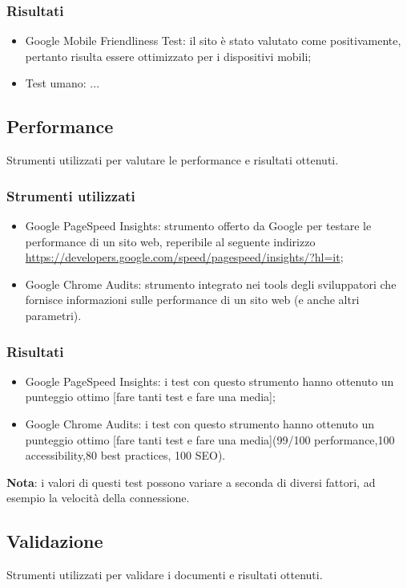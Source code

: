 \documentclass[12pt]{article}
\begin{document}
	\subsubsection{Risultati}
		\begin{itemize}
			\item Google Mobile Friendliness Test: il sito è stato valutato come positivamente, pertanto risulta essere ottimizzato per i dispositivi mobili;
			\item Test umano: ...
		\end{itemize}
	\subsection{Performance}
	Strumenti utilizzati per valutare le performance e risultati ottenuti.
	\subsubsection{Strumenti utilizzati}
		\begin{itemize}
			\item Google PageSpeed Insights: strumento offerto da Google per testare le performance di un sito web, reperibile al seguente indirizzo \url{https://developers.google.com/speed/pagespeed/insights/?hl=it};
			\item Google Chrome Audits: strumento integrato nei tools degli sviluppatori che fornisce informazioni sulle performance di un sito web (e anche altri parametri).
		\end{itemize}
	\subsubsection{Risultati}
		\begin{itemize}
			\item Google PageSpeed Insights: i test con questo strumento hanno ottenuto un punteggio ottimo [fare tanti test e fare una media];
			\item Google Chrome Audits: i test con questo strumento hanno ottenuto un punteggio ottimo [fare tanti test e fare una media](99/100 performance,100 accessibility,80 best practices, 100 SEO).
		\end{itemize}
	\textbf{Nota}: i valori di questi test possono variare a seconda di diversi fattori, ad esempio la velocità della connessione.
	\subsection{Validazione}
	Strumenti utilizzati per validare i documenti e risultati ottenuti.
\end{document}
